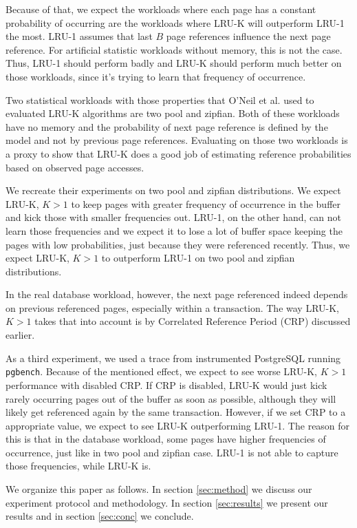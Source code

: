 Because of that, we expect the workloads where each page has a constant probability of occurring are the workloads where LRU-K will outperform LRU-1 the most. LRU-1 assumes that last $B$ page references influence the next page reference. For artificial statistic workloads without memory, this is not the case. Thus, LRU-1 should perform badly and LRU-K should perform much better on those workloads, since it's trying to learn that frequency of occurrence. 

Two statistical workloads with those properties that O'Neil et al. used to evaluated LRU-K algorithms are two pool and zipfian. Both of these workloads have no memory and the probability of next page reference is defined by the model and not by previous page references. Evaluating on those two workloads is a proxy to show that LRU-K does a good job of estimating reference probabilities based on observed page accesses. 

We recreate their experiments on two pool and zipfian distributions. We expect LRU-K, $K > 1$ to keep pages with greater frequency of occurrence in the buffer and kick those with smaller frequencies out. LRU-1, on the other hand, can not learn those frequencies and we expect it to lose a lot of buffer space keeping the pages with low probabilities, just because they were referenced recently. Thus, we expect LRU-K, $K > 1$ to outperform LRU-1 on two pool and zipfian distributions.

In the real database workload, however, the next page referenced indeed depends on previous referenced pages, especially within a transaction. The way LRU-K, $K > 1$ takes that into account is by Correlated Reference Period (CRP) discussed earlier.

As a third experiment, we used a trace from instrumented PostgreSQL running \texttt{pgbench}. Because of the mentioned effect, we expect to see worse LRU-K, $K > 1$ performance with disabled CRP. If CRP is disabled, LRU-K would just kick rarely occurring pages out of the buffer as soon as possible, although they will likely get referenced again by the same transaction. However, if we set CRP to a appropriate value, we expect to see LRU-K outperforming LRU-1. The reason for this is that in the database workload, some pages have higher frequencies of occurrence, just like in two pool and zipfian case. LRU-1 is not able to capture those frequencies, while LRU-K is.

We organize this paper as follows. In section \ref{sec:method} we discuss our experiment protocol and methodology. In section \ref{sec:results} we present our results and in section \ref{sec:conc} we conclude.